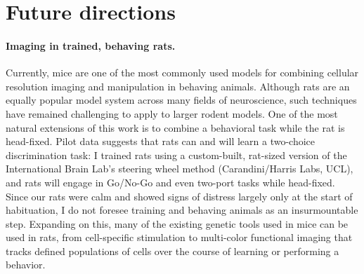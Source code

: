 
\section{Future directions}

\paragraph{Imaging in trained, behaving rats.} Currently, mice are one of the most commonly used models for combining cellular resolution imaging and manipulation in behaving animals. Although rats are an equally popular model system across many fields of neuroscience, such techniques have remained challenging to apply to larger rodent models. One of the most natural extensions of this work is to combine a behavioral task while the rat is head-fixed. Pilot data suggests that rats can and will learn a two-choice discrimination task: I trained rats using a custom-built, rat-sized version of the International Brain Lab's steering wheel method (Carandini/Harris Labs, UCL), and rats will engage in Go/No-Go and even two-port tasks while head-fixed. Since our rats were calm and showed signs of distress largely only at the start of habituation, I do not foresee training and behaving animals as an insurmountable step. Expanding on this, many of the existing genetic tools used in mice can be used in rats, from cell-specific stimulation to multi-color functional imaging that tracks defined populations of cells over the course of learning or performing a behavior. 

